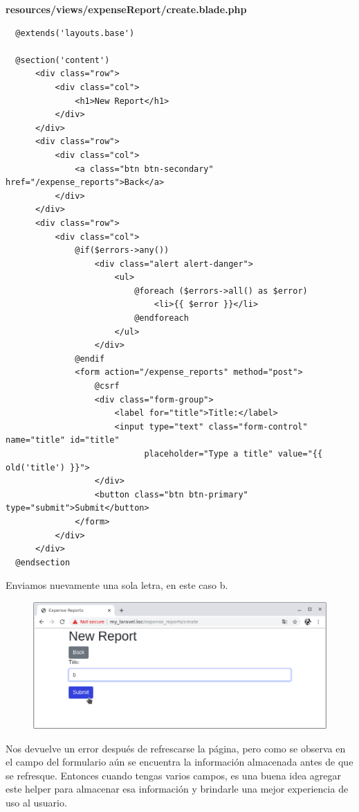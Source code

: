 \documentclass{article}
\begin{document}
\textbf{resources/views/expenseReport/create.blade.php}
\begin{verbatim}
  @extends('layouts.base')

  @section('content')
      <div class="row">
          <div class="col">
              <h1>New Report</h1>
          </div>
      </div>
      <div class="row">
          <div class="col">
              <a class="btn btn-secondary" href="/expense_reports">Back</a>
          </div>
      </div>
      <div class="row">
          <div class="col">
              @if($errors->any())
                  <div class="alert alert-danger">
                      <ul>
                          @foreach ($errors->all() as $error)
                              <li>{{ $error }}</li>
                          @endforeach
                      </ul>
                  </div>
              @endif
              <form action="/expense_reports" method="post">
                  @csrf
                  <div class="form-group">
                      <label for="title">Title:</label>
                      <input type="text" class="form-control" name="title" id="title"
                            placeholder="Type a title" value="{{ old('title') }}">
                  </div>
                  <button class="btn btn-primary" type="submit">Submit</button>
              </form>
          </div>
      </div>
  @endsection
\end{verbatim}

Enviamos nuevamente una sola letra, en este caso b.

\begin{figure}[h!]
  \centering
  \includegraphics[scale=0.5]{./Pictures/093_submit_b.png}
\end{figure}

Nos devuelve un error después de refrescarse la página, pero como se observa en
el campo del formulario aún se encuentra la información almacenada antes de que
se refresque. Entonces cuando tengas varios campos, es una buena idea agregar
este helper para almacenar esa información y brindarle una mejor experiencia de
uso al usuario.
\end{document}
